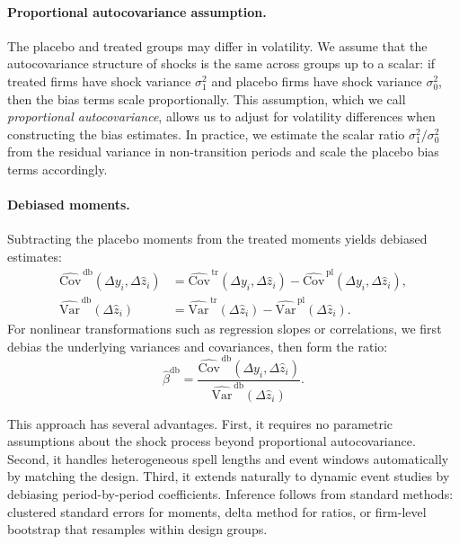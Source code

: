 \documentclass[11pt,a4paper]{article}
\newcommand{\Var}{\text{Var}}
\newcommand{\Cov}{\text{Cov}}
\begin{document}
\paragraph{Proportional autocovariance assumption.} The placebo and treated groups may differ in volatility. We assume that the autocovariance structure of shocks is the same across groups up to a scalar: if treated firms have shock variance $\sigma_1^2$ and placebo firms have shock variance $\sigma_0^2$, then the bias terms scale proportionally. This assumption, which we call \emph{proportional autocovariance}, allows us to adjust for volatility differences when constructing the bias estimates. In practice, we estimate the scalar ratio $\sigma_1^2/\sigma_0^2$ from the residual variance in non-transition periods and scale the placebo bias terms accordingly.

\paragraph{Debiased moments.} Subtracting the placebo moments from the treated moments yields debiased estimates:
\begin{align}
\widehat{\Cov}^{\,\text{db}}(\Delta y_i,\Delta \hat z_i) &= \widehat{\Cov}^{\,\text{tr}}(\Delta y_i,\Delta \hat z_i) - \widehat{\Cov}^{\,\text{pl}}(\Delta y_i,\Delta \hat z_i),\\
\widehat{\Var}^{\,\text{db}}(\Delta \hat z_i) &= \widehat{\Var}^{\,\text{tr}}(\Delta \hat z_i) - \widehat{\Var}^{\,\text{pl}}(\Delta \hat z_i).
\end{align}
For nonlinear transformations such as regression slopes or correlations, we first debias the underlying variances and covariances, then form the ratio:
\begin{equation}
\hat\beta^{\text{db}} = \frac{\widehat{\Cov}^{\,\text{db}}(\Delta y_i,\Delta \hat z_i)}{\widehat{\Var}^{\,\text{db}}(\Delta \hat z_i)}.
\end{equation}

This approach has several advantages. First, it requires no parametric assumptions about the shock process beyond proportional autocovariance. Second, it handles heterogeneous spell lengths and event windows automatically by matching the design. Third, it extends naturally to dynamic event studies by debiasing period-by-period coefficients. Inference follows from standard methods: clustered standard errors for moments, delta method for ratios, or firm-level bootstrap that resamples within design groups.
\end{document}

